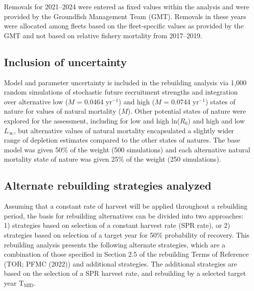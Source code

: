 \documentclass[11pt,
  letterpaper,
]{article}
\begin{document}
Removals for 2021--2024 were entered as fixed values within the analysis and were provided by the Groundfish Management Team (GMT). Removals in these years were allocated among fleets based on the fleet-specific values as provided by the GMT and not based on relative fishery mortality from 2017--2019.

\hypertarget{inclusion-of-uncertainty}{%
\subsection{Inclusion of uncertainty}\label{inclusion-of-uncertainty}}

Model and parameter uncertainty is included in the rebuilding analysis via 1,000 random simulations of stochastic future recruitment strengths and integration over alternative low (\(M\) = 0.0464 yr\(^{-1}\)) and high (\(M\) = 0.0744 yr\(^{-1}\)) states of nature for values of natural mortality (\(M\)). Other potential states of nature were explored for the assessment, including for low and high ln(\(R_0\)) and high and low \(L_{\infty}\), but alternative values of natural mortality encapsulated a slightly wider range of depletion estimates compared to the other states of natures. The base model was given 50\(\%\) of the weight (500 simulations) and each alternative natural mortality state of nature was given 25\(\%\) of the weight (250 simulations).

\hypertarget{alternate-rebuilding-strategies-analyzed}{%
\subsection{Alternate rebuilding strategies analyzed}\label{alternate-rebuilding-strategies-analyzed}}

Assuming that a constant rate of harvest will be applied throughout a rebuilding period, the basis for rebuilding alternatives can be divided into two approaches: 1) strategies based on selection of a constant harvest rate (SPR rate), or 2) strategies based on selection of a target year for 50\(\%\) probability of recovery. This rebuilding analysis presents the following alternate strategies, which are a combination of those specified in Section 2.5 of the rebuilding Terms of Reference (TOR; PFMC (2022)) and additional strategies. The additional strategies are based on the selection of a SPR harvest rate, and rebuilding by a selected target year \(\text{T}_\text{MID}\).
\end{document}
